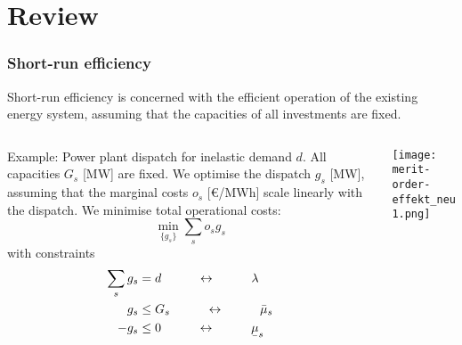 \documentclass[10pt,aspectratio=169,dvipsnames]{beamer}
\def\l{\lambda}
\def\m{\mu}
\newcommand{\ubar}[1]{\text{\b{$#1$}}}
\begin{document}
\section{Review}


\begin{frame}
  \frametitle{Short-run efficiency}

  Short-run efficiency is concerned with the \alert{efficient operation} of the existing energy system, assuming that the capacities of all investments are fixed.
  \begin{columns}[T]
    \begin{column}{7.5cm}

      \alert{Example}: Power plant dispatch for inelastic demand $d$. All capacities $G_s$ [MW] are fixed. We optimise the \alert{dispatch} $g_s$ [MW], assuming that the \alert{marginal costs} $o_s$ [\euro/MWh] scale linearly with the dispatch. We minimise \alert{total operational costs}:
      \begin{equation*}
        \min_{\{g_s\}} \sum_s o_s g_s
      \end{equation*}
      with constraints
  \begin{align*}
    \sum_s g_s & = d\hspace{1cm} \leftrightarrow \hspace{1cm} \l \\
        g_s  & \leq  G_s  \hspace{1cm}\leftrightarrow\hspace{1cm} \bar{\m}_s \\
    - g_s  & \leq  0  \hspace{1cm}\leftrightarrow\hspace{1cm} \ubar{\m}_s
  \end{align*}
    \end{column}
    \begin{column}{6.5cm}

        \vspace{.5cm}
        \texttt{[image: merit-order-effekt\_neu1.png]}


    \end{column}
  \end{columns}

\end{frame}
\end{document}
